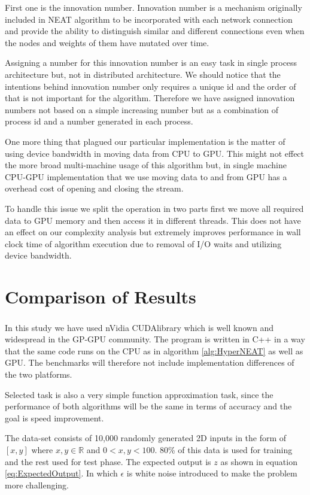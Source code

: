 \documentclass[twocolumn]{article}
\begin{document}
First one is the innovation number. Innovation number is a mechanism originally included in NEAT algorithm to be incorporated with each network connection and provide the ability to distinguish similar and different connections even when the nodes and weights of them have mutated over time. \cite{originalNEAT}

Assigning a number for this innovation number is an easy task in single process architecture but, not in distributed architecture. We should notice that the intentions behind innovation number only requires a unique id and the order of that is not important for the algorithm. Therefore we have assigned innovation numbers not based on a simple increasing number but as a combination of process id and a number generated in each process.

One more thing that plagued our particular implementation is the matter of using device bandwidth in moving data from CPU to GPU. This might not effect the more broad multi-machine usage of this algorithm but, in single machine CPU-GPU implementation that we use moving data to and from GPU has a overhead cost of opening and closing the stream.

To handle this issue we split the operation in two parts first we move all required data to GPU memory and then access it in different threads. This does not have an effect on our complexity analysis but extremely improves performance in wall clock time of algorithm execution due to removal of I/O waits and utilizing device bandwidth.



\section{Comparison of Results}
In this study we have used nVidia CUDA\textsuperscript \textregistered library which is well known and widespread in the GP-GPU community. The program is written in C++ in a way that the same code runs on the CPU as in algorithm \ref{alg:HyperNEAT} as well as GPU. The benchmarks will therefore not include implementation differences of the two platforms.

Selected task is also a very simple function approximation task, since the performance of both algorithms will be the same in terms of accuracy and the goal is speed improvement.

The data-set consists of 10,000 randomly generated 2D inputs in the form of $[x,y]$ where $x,y \in \mathbb{R}$ and $0<x,y<100$. 80\% of this data is used for training and the rest used for test phase. The expected output is $z$ as shown in equation \ref{eq:ExpectedOutput}. In which $\epsilon$ is white noise introduced to make the problem more challenging.
\end{document}
